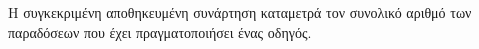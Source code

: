 Η συγκεκριμένη αποθηκευμένη συνάρτηση καταμετρά τον συνολικό αριθμό των παραδόσεων που έχει πραγματοποιήσει ένας οδηγός.
\hfill \break